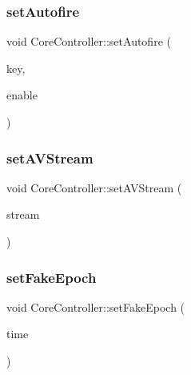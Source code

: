 \subsubsection{\texorpdfstring{set\+Autofire}{setAutofire}}
{\footnotesize\ttfamily void Core\+Controller\+::set\+Autofire (\begin{DoxyParamCaption}\item[{\mbox{\hyperlink{ioapi_8h_a787fa3cf048117ba7123753c1e74fcd6}{int}}}]{key,  }\item[{\mbox{\hyperlink{libretro_8h_a4a26dcae73fb7e1528214a068aca317e}{bool}}}]{enable }\end{DoxyParamCaption})\hspace{0.3cm}{\ttfamily [slot]}}

\mbox{\label{class_q_g_b_a_1_1_core_controller_a09ce4ac8f3fd85c686423aa45d4f20a3}} 
\subsubsection{\texorpdfstring{set\+A\+V\+Stream}{setAVStream}}
{\footnotesize\ttfamily void Core\+Controller\+::set\+A\+V\+Stream (\begin{DoxyParamCaption}\item[{m\+A\+V\+Stream $\ast$}]{stream }\end{DoxyParamCaption})\hspace{0.3cm}{\ttfamily [slot]}}

\mbox{\label{class_q_g_b_a_1_1_core_controller_a7f09410184e61422372609a6605c9052}} 
\subsubsection{\texorpdfstring{set\+Fake\+Epoch}{setFakeEpoch}}
{\footnotesize\ttfamily void Core\+Controller\+::set\+Fake\+Epoch (\begin{DoxyParamCaption}\item[{const Q\+Date\+Time \&}]{time }\end{DoxyParamCaption})\hspace{0.3cm}{\ttfamily [slot]}}

